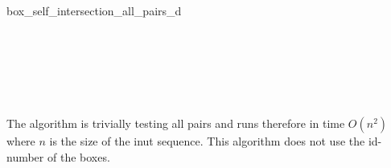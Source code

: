 \begin{ccRefFunction}{box_self_intersection_all_pairs_d}
\ccSeeAlso

\\
\\

\\
\\

\ccImplementation

The algorithm is trivially testing all pairs and runs therefore in time
$O(n^2)$ where $n$ is the size of the inut sequence. This algorithm
does not use the {id}-number of the boxes.

\end{ccRefFunction}


